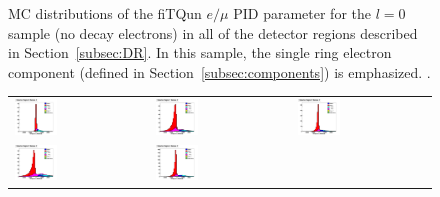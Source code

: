 {\begin{figure}[h!]
\begin{tabular}{l  l  l}
\end{tabular}
\caption{MC distributions of the fiTQun $e/\mu$ PID parameter for the $l = 0$
sample (no decay electrons) in all of the detector regions described in
Section~\ref{subsec:DR}.  In this sample, the single ring electron component
(defined in Section~\ref{subsec:components}) is emphasized. 
\towall.}
\label{fig:samplot0}
\end{figure}

\begin{figure}[h!]
\centering
\begin{tabular}{l  l  l}
  \includegraphics[width=0.33\textwidth]{plots/mc_breakdown_comp_1_bin_0_att_0} 
  &\includegraphics[width=0.33\textwidth]{plots/mc_breakdown_comp_1_bin_1_att_0}  
  &\includegraphics[width=0.33\textwidth]{plots/mc_breakdown_comp_1_bin_2_att_0} \\
  \includegraphics[width=0.33\textwidth]{plots/mc_breakdown_comp_1_bin_3_att_0} 
  &\includegraphics[width=0.33\textwidth]{plots/mc_breakdown_comp_1_bin_4_att_0} 

\end{tabular}
\end{figure}}
